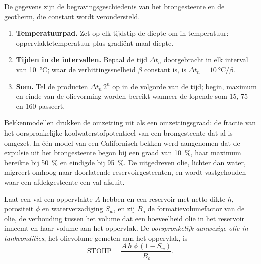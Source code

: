 \begin{method}\label{met:b2:energy-geology:tti}
De gegevens zijn de begravingsgeschiedenis van het brongesteente en de geotherm, die constant wordt verondersteld.
\begin{enumerate}
  \item \textbf{Temperatuurpad.} Zet op elk tijdstip de diepte om in temperatuur: oppervlaktetemperatuur
        plus gradiënt maal diepte.
  \item \textbf{Tijden in de intervallen.} Bepaal de tijd $\Delta t_n$ doorgebracht in elk interval van
        \qty{10}{\celsius}; waar de verhittingssnelheid $\beta$ constant is, is $\Delta t_n = \qty{10}{\celsius}/\beta$.
  \item \textbf{Som.} Tel de producten $\Delta t_n\,2^n$ op in de volgorde van de tijd; begin, maximum en
        einde van de olievorming worden bereikt wanneer de lopende som 15, 75 en 160 passeert.
\end{enumerate}
\end{method}

Bekkenmodellen drukken de omzetting uit als een omzettingsgraad: de fractie van het oorspronkelijke
koolwaterstofpotentieel van een brongesteente dat al is omgezet. In één model van een Californisch bekken
werd aangenomen dat de expulsie uit het brongesteente begon bij een graad van \qty{10}{\percent}, haar maximum bereikte bij
\qty{50}{\percent} en eindigde bij \qty{95}{\percent}. De uitgedreven olie, lichter dan water,
migreert omhoog naar doorlatende reservoirgesteenten, en wordt vastgehouden waar een afdekgesteente een val afsluit.

\begin{proposition}\label{prop:b2:energy-geology:volumetrics}
Laat een val een oppervlakte $A$ hebben en een reservoir met netto dikte $h$, porositeit $\phi$ en waterverzadiging
$S_w$, en zij $B_o$ de formatievolumefactor van de olie, de verhouding tussen het volume dat een hoeveelheid
olie in het reservoir inneemt en haar volume aan het oppervlak. De
\emph{oorspronkelijk aanwezige olie in tankcondities}, het olievolume gemeten aan het oppervlak, is
\begin{equation}
\mathrm{STOIIP} = \frac{A\,h\,\phi\,(1 - S_w)}{B_o} .
\label{eq:b2:energy-geology:stoiip}
\end{equation}
\end{proposition}

